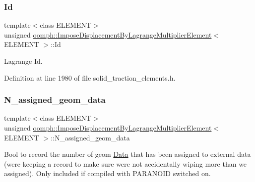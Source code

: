 \subsubsection{\texorpdfstring{Id}{Id}}
{\footnotesize\ttfamily template$<$class E\+L\+E\+M\+E\+NT$>$ \\
unsigned \hyperlink{classoomph_1_1ImposeDisplacementByLagrangeMultiplierElement}{oomph\+::\+Impose\+Displacement\+By\+Lagrange\+Multiplier\+Element}$<$ E\+L\+E\+M\+E\+NT $>$\+::Id\hspace{0.3cm}{\ttfamily [protected]}}



Lagrange Id. 



Definition at line 1980 of file solid\+\_\+traction\+\_\+elements.\+h.

\mbox{\label{classoomph_1_1ImposeDisplacementByLagrangeMultiplierElement_a152b5d78d73fa32a82153b32633794c0}} 
\subsubsection{\texorpdfstring{N\+\_\+assigned\+\_\+geom\+\_\+data}{N\_assigned\_geom\_data}}
{\footnotesize\ttfamily template$<$class E\+L\+E\+M\+E\+NT$>$ \\
unsigned \hyperlink{classoomph_1_1ImposeDisplacementByLagrangeMultiplierElement}{oomph\+::\+Impose\+Displacement\+By\+Lagrange\+Multiplier\+Element}$<$ E\+L\+E\+M\+E\+NT $>$\+::N\+\_\+assigned\+\_\+geom\+\_\+data\hspace{0.3cm}{\ttfamily [protected]}}



Bool to record the number of geom \hyperlink{classoomph_1_1Data}{Data} that has been assigned to external data (we\textquotesingle{}re keeping a record to make sure we\textquotesingle{}re not accidentally wiping more than we assigned). Only included if compiled with P\+A\+R\+A\+N\+O\+ID switched on. 



